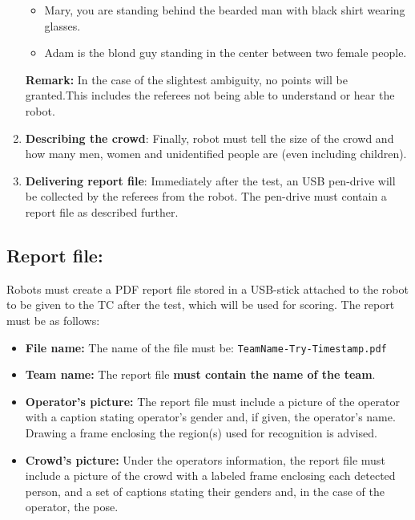 \begin{enumerate}
\begin{itemize}
    \item Mary, you are standing behind the bearded man with black shirt wearing glasses.

    \item Adam is the blond guy standing in the center between two female people.
  \end{itemize}

  \textbf{Remark:} In the case of the slightest ambiguity, no points will be granted.This includes the referees not being able to understand or hear the robot.

  \item \textbf{Describing the crowd}: Finally, robot must tell the size of the crowd and how many men, women and unidentified people are (even including children).

  \item \textbf{Delivering report file}: Immediately after the test, an USB pen-drive will be collected by the referees from the robot. The pen-drive must contain a report file as described further.
\end{enumerate}

\subsection{Report file:}
Robots must create a PDF report file stored in a USB-stick attached to the robot to be given to the TC after the test, which will be used for scoring. The report must be as follows:
\begin{itemize}

  \item \textbf{File name:} The name of the file must be: \texttt{TeamName-Try-Timestamp.pdf}

  \item \textbf{Team name:} The report file \textbf{must contain the name of the team}.

  \item \textbf{Operator's picture: } The report file must include a picture of the operator with a caption stating operator's gender and, if given, the operator's name. Drawing a frame enclosing the region(s) used for recognition is advised.

  \item \textbf{Crowd's picture:} Under the operators information, the report file must include a picture of the crowd with a labeled frame enclosing each detected person, and a set of captions stating their genders and, in the case of the operator, the pose. 
\end{itemize}

